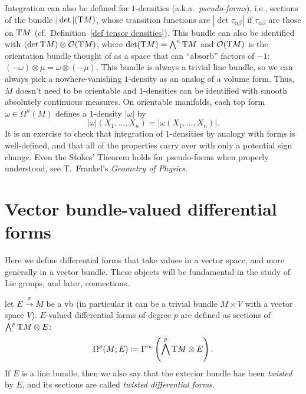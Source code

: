\begin{rem}
    Integration can also be defined for $1$-densities (a.k.a.~\emph{pseudo-forms}), i.e., sections of the bundle $|\det|(\mathrm{T} M)$, whose transition functions are $|\det\tau_{\alpha\beta}|$ if $\tau_{\alpha\beta}$ are those on $\mathrm{T} M$ (cf.\ Definition~\ref{def tensor densities}). This bundle can also be identified with $(\det \mathrm{T} M)\otimes \mathcal{O}(\mathrm{T} M)$, where $\det (\mathrm{T} M)=\bigwedge^n \mathrm{T} M$ and $\mathcal{O}(\mathrm{T} M)$ is the orientation bundle thought of as a space that can ``absorb'' factors of $- 1$: $(-\omega)\otimes \mu=\omega\otimes (-\mu)$. This bundle is always a trivial line bundle, so we can always pick a nowhere-vanishing $1$-density as an analog of a volume form. Thus, $M$ doesn't need to be orientable and $1$-densities can be identified with smooth absolutely continuous measures. On orientable manifolds, each top form $\omega\in\Omega^n(M)$ defines a $1$-density $|\omega|$ by 
    \[|\omega|(X_1,\ldots,X_n)=|\omega(X_1,\ldots,X_n)|.\]
    It is an exercise to check that integration of $1$-densities by analogy with forms is well-defined, and that all of the properties carry over with only a potential sign change. Even the Stokes' Theorem holds for pseudo-forms when properly understood, see T.~Frankel's \emph{Geometry of Physics}.
\end{rem}







\section{Vector bundle-valued differential forms}

Here we define differential forms that take values in a vector space, and more generally in a vector bundle. These objects will be fundamental in the study of Lie groups, and later, connections.

\begin{defn}
    let $E\overset\pi\to M$ be a \gls{vb} (in particular it can be a trivial bundle $M\times V$ with a vector space $V$). $E$-valued differential forms of degree $p$ are defined as sections of $\bigwedge^p\mathrm{T} M\otimes E$:
    \[\Omega^p(M;E)\coloneqq \Gamma^\infty\left(\bigwedge^p \mathrm{T} M\otimes E\right).\]
     If $E$ is a line bundle, then we also say that the exterior bundle has been \emph{twisted} by $E$, and its sections are called \emph{twisted differential forms}.
\end{defn}


